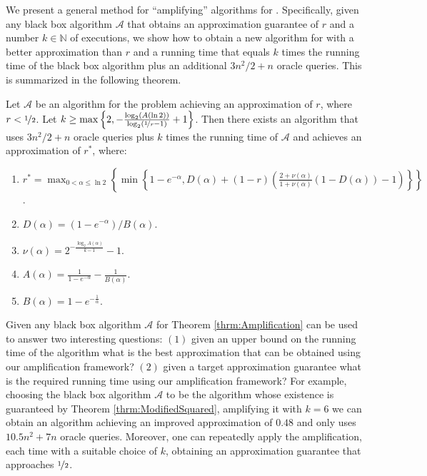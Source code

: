 \documentclass[a4paper,UKenglish,cleveref, autoref]{lipics-v2019}
\begin{document}
 We present a general method for ``amplifying'' algorithms for \SK.
Specifically, given any black box algorithm $\mathcal{A}$ that obtains an approximation guarantee of $r$ and a number $k\in \mathbb{N}$ of executions, we show how to obtain a new algorithm for \SK with a better approximation than $r$ and a running time that equals $k$ times the running time of the black box algorithm plus an additional  $3n^2/2+n$ oracle queries.
This is summarized in the following theorem.
\begin{theorem}
	\label{thrm:Amplification}
Let $\mathcal{A}$ be an algorithm for the \SK problem achieving an approximation of $r$, where $r< \nicefrac[]{1}{2}$.
Let $k\geq \max \left\{2, -\frac{\log_2(A(\ln 2))}{\log_2(\nicefrac[]{1}{r} -1 ) }+1 \right\}$.
Then there exists an algorithm that uses $3n^2/2+n$ oracle queries plus $k$ times the running time of $\mathcal{A}$ and achieves an approximation of $r^*$, where:
\begin{enumerate}
\item $r^* = \max _{0< \alpha \leq \ln{2}} \left\{ \min \left\{ 1-e^{-\alpha},D(\alpha)+(1-r)\left( \frac{2+\nu(\alpha)}{1+\nu(\alpha)} (1-D(\alpha)) -1\right)\right\}\right\}$.
\item $ D(\alpha)=(1-e^{-\alpha})/B(\alpha)$.
\item $\nu(\alpha ) = 2^{-\frac{\log _2 {A(\alpha)}}{k-1}}-1$.
\item $ A(\alpha) = \frac{1}{1-e^{-\alpha}}-\frac{1}{B(\alpha)}$.
\item $ B(\alpha)=1-e^{-\frac{1}{\alpha}}$.
\end{enumerate}
\end{theorem}

Given any black box algorithm $\mathcal{A}$ for \SK Theorem \ref{thrm:Amplification} can be used to answer two interesting questions: $(1)$ given an upper bound on the running time of the algorithm what is the best approximation that can be obtained using our amplification framework? $(2)$ given a target approximation guarantee what is the required running time using our amplification framework?
For example, choosing the black box algorithm $\mathcal{A}$ to be the algorithm whose existence is guaranteed by Theorem \ref{thrm:ModifiedSquared}, amplifying it with $k=6$ we can obtain an algorithm achieving an improved approximation of $0.48$ and only uses  $10.5n^2+7n$ oracle queries.
Moreover, one can repeatedly apply the amplification, each time with a suitable choice of $k$, obtaining an approximation guarantee that approaches $\nicefrac[]{1}{2}$.
\end{document}
